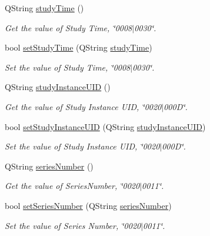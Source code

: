 \begin{DoxyCompactItemize}
Q\+String \hyperlink{class_dicom_dictionary_interface_a0b8855598a148d2a15828808dd3f62f3}{study\+Time} ()
\begin{DoxyCompactList}\small\item\em Get the value of Study Time, \char`\"{}0008$\vert$0030\char`\"{}. \end{DoxyCompactList}\item 
bool \hyperlink{class_dicom_dictionary_interface_aa89d9c7cc352b77e2c79330935960954}{set\+Study\+Time} (Q\+String \hyperlink{class_dicom_dictionary_interface_a0b8855598a148d2a15828808dd3f62f3}{study\+Time})
\begin{DoxyCompactList}\small\item\em Set the value of Study Time, \char`\"{}0008$\vert$0030\char`\"{}. \end{DoxyCompactList}\item 
Q\+String \hyperlink{class_dicom_dictionary_interface_a3aa2b935c914174a816741e7b84107d3}{study\+Instance\+U\+ID} ()
\begin{DoxyCompactList}\small\item\em Get the value of Study Instance U\+ID, \char`\"{}0020$\vert$000\+D\char`\"{}. \end{DoxyCompactList}\item 
bool \hyperlink{class_dicom_dictionary_interface_a821babbdf04d1247086dab20c31ebccb}{set\+Study\+Instance\+U\+ID} (Q\+String \hyperlink{class_dicom_dictionary_interface_a3aa2b935c914174a816741e7b84107d3}{study\+Instance\+U\+ID})
\begin{DoxyCompactList}\small\item\em Set the value of Study Instance U\+ID, \char`\"{}0020$\vert$000\+D\char`\"{}. \end{DoxyCompactList}\item 
Q\+String \hyperlink{class_dicom_dictionary_interface_a0262904d88f9e9a8dbd30bc112ec4b43}{series\+Number} ()
\begin{DoxyCompactList}\small\item\em Get the value of Series\+Number, \char`\"{}0020$\vert$0011\char`\"{}. \end{DoxyCompactList}\item 
bool \hyperlink{class_dicom_dictionary_interface_ad862cf021e628f7534c8bdddf6233e6c}{set\+Series\+Number} (Q\+String \hyperlink{class_dicom_dictionary_interface_a0262904d88f9e9a8dbd30bc112ec4b43}{series\+Number})
\begin{DoxyCompactList}\small\item\em Set the value of Series Number, \char`\"{}0020$\vert$0011\char`\"{}. \end{DoxyCompactList}\item 

\end{DoxyCompactItemize}

